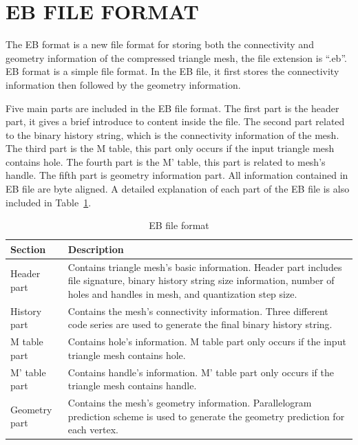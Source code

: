 \documentclass[onecolumn, 12pt]{article}
\begin{document}
\section{EB FILE FORMAT} \label{sec:EB}
The EB format is a new file format for storing both the connectivity and geometry information of the compressed triangle mesh, the file extension is ``.eb''. EB format is a simple file format. In the EB file, it first stores the connectivity information then followed by the geometry information.

Five main parts are included in the EB file format. The first part is the header part, it gives a brief introduce to content inside the file. The second part related to the binary history string, which is the connectivity information of the mesh. The third part is the M table, this part only occurs if the input triangle mesh contains hole. The fourth part is the M' table, this part is related to mesh's handle. The fifth part is geometry information part. All information contained in EB file are byte aligned. A detailed explanation of each part of the EB file is also included in Table~\ref{tab:EBformat}.

\begin{table}[h]
\normalsize
\centering
\caption{EB file format}
  \begin{tabular}{| l | p{} | }
    \hline
    Section & Description \\
    \hline
    Header part & Contains triangle mesh's basic information. Header part includes file signature, binary history string size information, number of holes and handles in mesh, and quantization step size.\\
    \hline
    History part & Contains the mesh's connectivity information. Three different code series are used to generate the final binary history string.\\
    \hline
    M table part & Contains hole's information. M table part only occurs if the input triangle mesh contains hole. \\
    \hline
    M' table part & Contains handle's information. M' table part only occurs if the triangle mesh contains handle. \\
    \hline
    Geometry part &  Contains the mesh's geometry information. Parallelogram prediction scheme is used to generate the geometry prediction for each vertex.\\
    \hline
    \hline
  \end{tabular}
  \label{tab:EBformat}
\end{table}
\end{document}
